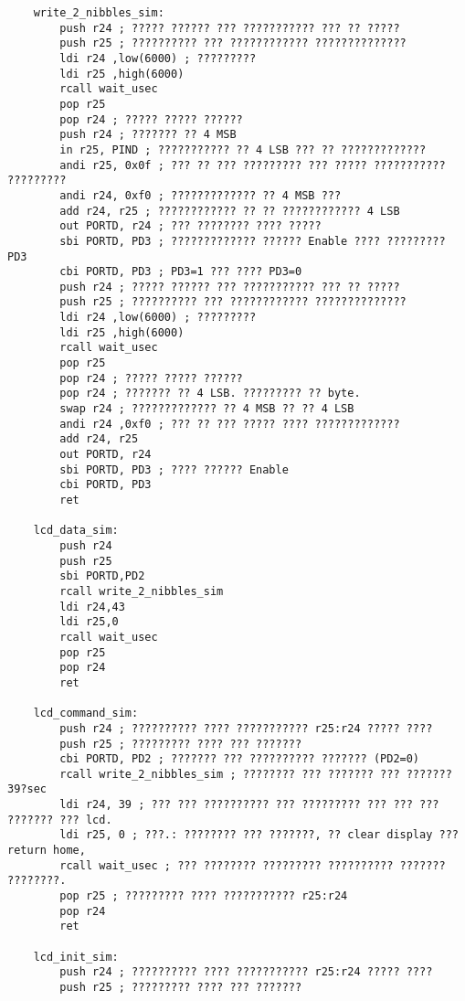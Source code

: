 \documentclass{article}
\begin{document}
\begin{verbatim}
	write_2_nibbles_sim:
        push r24 ; ????? ?????? ??? ??????????? ??? ?? ?????
        push r25 ; ?????????? ??? ???????????? ??????????????
        ldi r24 ,low(6000) ; ?????????
        ldi r25 ,high(6000)
        rcall wait_usec
        pop r25
        pop r24 ; ????? ????? ??????
        push r24 ; ??????? ?? 4 MSB
        in r25, PIND ; ??????????? ?? 4 LSB ??? ?? ?????????????
        andi r25, 0x0f ; ??? ?? ??? ????????? ??? ????? ??????????? ?????????
        andi r24, 0xf0 ; ????????????? ?? 4 MSB ???
        add r24, r25 ; ???????????? ?? ?? ???????????? 4 LSB
        out PORTD, r24 ; ??? ???????? ???? ?????
        sbi PORTD, PD3 ; ????????????? ?????? Enable ???? ????????? PD3
        cbi PORTD, PD3 ; PD3=1 ??? ???? PD3=0
        push r24 ; ????? ?????? ??? ??????????? ??? ?? ?????
        push r25 ; ?????????? ??? ???????????? ??????????????
        ldi r24 ,low(6000) ; ?????????
        ldi r25 ,high(6000)
        rcall wait_usec
        pop r25
        pop r24 ; ????? ????? ??????
        pop r24 ; ??????? ?? 4 LSB. ????????? ?? byte.
        swap r24 ; ????????????? ?? 4 MSB ?? ?? 4 LSB
        andi r24 ,0xf0 ; ??? ?? ??? ????? ???? ?????????????
        add r24, r25
        out PORTD, r24
        sbi PORTD, PD3 ; ???? ?????? Enable
        cbi PORTD, PD3
        ret

	lcd_data_sim:
        push r24
        push r25
        sbi PORTD,PD2
        rcall write_2_nibbles_sim
        ldi r24,43
        ldi r25,0
        rcall wait_usec
        pop r25
        pop r24
        ret

	lcd_command_sim:
        push r24 ; ?????????? ???? ??????????? r25:r24 ????? ????
        push r25 ; ????????? ???? ??? ???????
        cbi PORTD, PD2 ; ??????? ??? ?????????? ??????? (PD2=0)
        rcall write_2_nibbles_sim ; ???????? ??? ??????? ??? ??????? 39?sec
        ldi r24, 39 ; ??? ??? ?????????? ??? ????????? ??? ??? ??? ??????? ??? lcd.
        ldi r25, 0 ; ???.: ???????? ??? ???????, ?? clear display ??? return home,
        rcall wait_usec ; ??? ???????? ????????? ?????????? ??????? ????????.
        pop r25 ; ????????? ???? ??????????? r25:r24
        pop r24
        ret 

	lcd_init_sim:
        push r24 ; ?????????? ???? ??????????? r25:r24 ????? ????
        push r25 ; ????????? ???? ??? ???????


\end{verbatim}
\end{document}
